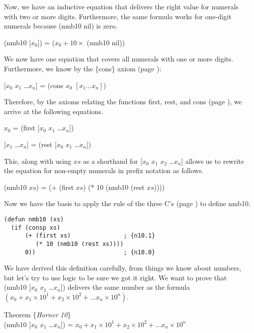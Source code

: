 Now, we have an inductive equation that delivers the right value for
numerals with two or more digits. Furthermore, the same formula works
for one-digit numerals because (nmb10 nil) is zero.
\begin{center}
(nmb10 [$x_0$]) = ($x_0 + 10 \times$ (nmb10 nil))
\end{center}

We now have one equation that covers all numerals with one or more digits.
Furthermore, we know by the \{cons\} axiom
(page \pageref{first-rest-cons}):
\begin{center}
[$x_0$ $x_1$ \dots $x_{n}$] = (cons $x_0$ $[x_1 \dots x_n]$)
\end{center}

Therefore, by the axioms relating the functions
first, rest, and cons
(page \pageref{first-rest-cons}),
we arrive at the following equations.

\begin{samepage}
\begin{center}
$x_0$ = (first [$x_0$ $x_1$ \dots $x_{n}$]) %
\end{center}                                %
\begin{center}
[$x_1$ \dots $x_{n}$] = (rest [$x_0$ $x_1$ \dots $x_{n}$])
\end{center}
\end{samepage}


This, along with using $xs$
as a shorthand for [$x_0$ $x_1$ $x_2$ \dots $x_{n}$]
allows us to rewrite the equation
for non-empty numerals in prefix notation as follows.
\begin{center}
(nmb10 $xs$) = (+ (first $xs$) ($*$ 10 (nmb10 (rest $xs$))))
\end{center}

Now we have the basis to apply the rule of the three C's
(page \pageref{fig:inductive-def-keys}) to define nmb10.


\label{nmb10-defun}
\begin{Verbatim}
(defun nmb10 (xs)
  (if (consp xs)
      (+ (first xs)               ; {n10.1}
         (* 10 (nmb10 (rest xs))))
      0))                         ; {n10.0}
\end{Verbatim}

We have derived this definition carefully,
from things we know about numbers,
but let's try to use logic to be sure we got it right.
We want to prove that
(nmb10 [$x_0$ $x_1$ \dots $x_{n}$])
delivers the same number as the formula
$(x_0 + x_1 \times 10^1 + x_2 \times 10^2 + \dots x_{n} \times 10^{n})$.
\begin{samepage}
\label{horner10-thm}
\begin{center}
Theorem \{\emph{Horner 10}\} \\
(nmb10 [$x_0$ $x_1$ \dots $x_{n}$]) =
$x_0 + x_1 \times 10^1 + x_2 \times 10^2 + \dots x_{n} \times 10^{n}$
\end{center}
\end{samepage}

